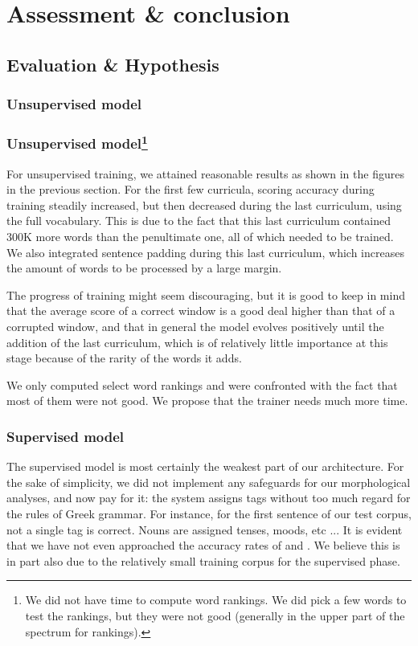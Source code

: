 \chapter{Assessment \& conclusion}
\label{chp:assessment}

\section{Evaluation \& Hypothesis}

\subsection{Unsupervised model}
\subsection[Unsupervised model]{Unsupervised model\footnote{We did not have time to compute word rankings. We did pick a few words to test the rankings, but they were not good (generally in the upper part of the spectrum for rankings).}}
For unsupervised training, we attained reasonable results as shown in the
figures in the previous section. For the first few curricula, scoring
accuracy during training steadily increased, but then decreased during
the last curriculum, using the full vocabulary. This is due to the
fact that this last curriculum contained 300K more words than the
penultimate one, all of which needed to be trained. We also integrated
sentence padding during this last curriculum, which increases the
amount of words to be processed by a large margin.

The progress of training might seem discouraging, but it is good to
keep in mind that the average score of a correct window is a good deal
higher than that of a corrupted window, and that in general the model
evolves positively until the addition of the last curriculum, which is
of relatively little importance at this stage because of the rarity of
the words it adds.

We only computed select word rankings and were confronted with the
fact that most of them were not good. We propose that the trainer
needs much more time.

\subsection{Supervised model}
The supervised model is most certainly the weakest part of our
architecture. For the sake of simplicity, we did not implement any
safeguards for our morphological analyses, and now pay for it: the
system assigns tags without too much regard for the rules of Greek
grammar. For instance, for the first sentence of our test corpus, not
a single tag is correct. Nouns are assigned tenses, moods, etc ... It
is evident that we have not even approached the accuracy rates of
\cite{mambrini2012} and \cite{dik2008,dik2009}. We believe this is in
part also due to the relatively small training corpus for the
supervised phase.


